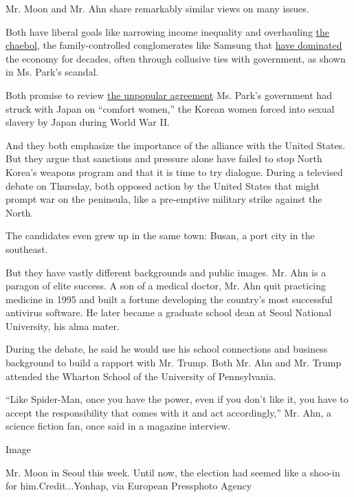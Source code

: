 Mr. Moon and Mr. Ahn share remarkably similar views on many issues.

Both have liberal goals like narrowing income inequality and overhauling
\href{http://www.nytimes3xbfgragh.onion/2011/09/14/business/global/south-korean-chaebol-under-increasing-pressure.html}{the
chaebol}, the family-controlled conglomerates like Samsung that
\href{https://www.nytimes3xbfgragh.onion/2017/01/02/world/asia/south-korea-park-geun-hye-samsung.html}{have
dominated} the economy for decades, often through collusive ties with
government, as shown in Ms. Park's scandal.

Both promise to review
\href{https://www.nytimes3xbfgragh.onion/2015/12/29/world/asia/comfort-women-south-korea-japan.html}{the
unpopular agreement} Ms. Park's government had struck with Japan on
``comfort women,'' the Korean women forced into sexual slavery by Japan
during World War II.

And they both emphasize the importance of the alliance with the United
States. But they argue that sanctions and pressure alone have failed to
stop North Korea's weapons program and that it is time to try dialogue.
During a televised debate on Thursday, both opposed action by the United
States that might prompt war on the peninsula, like a pre-emptive
military strike against the North.

The candidates even grew up in the same town: Busan, a port city in the
southeast.

But they have vastly different backgrounds and public images. Mr. Ahn is
a paragon of elite success. A son of a medical doctor, Mr. Ahn quit
practicing medicine in 1995 and built a fortune developing the country's
most successful antivirus software. He later became a graduate school
dean at Seoul National University, his alma mater.

During the debate, he said he would use his school connections and
business background to build a rapport with Mr. Trump. Both Mr. Ahn and
Mr. Trump attended the Wharton School of the University of Pennsylvania.

``Like Spider-Man, once you have the power, even if you don't like it,
you have to accept the responsibility that comes with it and act
accordingly,'' Mr. Ahn, a science fiction fan, once said in a magazine
interview.

Image

Mr. Moon in Seoul this week. Until now, the election had seemed like a
shoo-in for him.Credit...Yonhap, via European Pressphoto Agency

